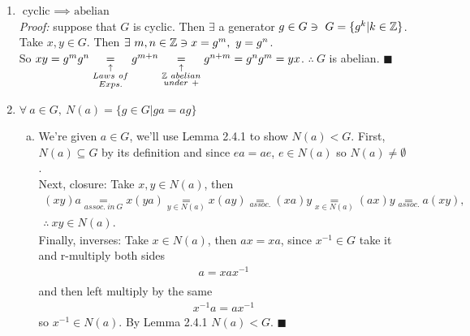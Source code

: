 \begin{enumerate}
\item $\boxed{\text{cyclic }\implies \text{ abelian}}$ \\
\textit{Proof: } suppose that $G$ is cyclic. Then $\exists$ a generator $g\in G \ni \ G=\{g^k | k \in {\mathbb{Z}}\}$. Take $x,y \in G$. Then $\exists \ m,n \in \Z \ni x=g^m, \ y=g^n$. \\

So $xy = g^m g^n \underset{\substack{\uparrow \\ Laws \ of \\ Exps.}}{=} g^{m+n} \underset{\substack{\uparrow \\ \Z \ abelian \\ under \ +}}{=} g^{n+m} = g^ng^m = yx$. $\therefore \ G$ is abelian. $\blacksquare$ 

\item $\forall \ a \in G, \ N(a) = \{g \in G | ga = ag \} $
\begin{enumerate}[a)]
    \item We're given $a\in G$, we'll use Lemma 2.4.1 to show $N(a)<G$.
    First, $N(a) \subseteq G$ by its definition and since $ea = ae$, $e\in N(a)$ so $N(a)\neq \emptyset$. \\
    Next, closure: Take $x,y \in N(a)$, then
    \begin{align*}
        (xy)a \underset{assoc. \ in \ G}{=} x(ya) \underset{y\in N(a)}{=} x(ay) \underset{assoc.}{=} (xa)y \underset{x\in N(a)}{=} (ax)y \underset{assoc.}{=}a(xy), \\ 
        \therefore \ xy \in N(a).
    \end{align*}
    Finally, inverses: Take $x\in N(a)$, then $ax=xa$, since $x^{-1} \in G$ take it and r-multiply both sides
    \begin{align*}
        a = xax^{-1} \\
    \end{align*}
    and then left multiply by the same
    \begin{align*}
        x^{-1}a= ax^{-1}
    \end{align*}
    so $x^{-1}\in N(a)$. By Lemma 2.4.1 $N(a)<G$. $\blacksquare$


\end{enumerate}
\end{enumerate}
